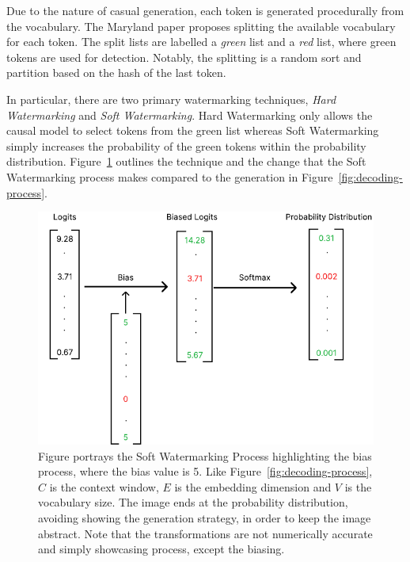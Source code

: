 \documentclass{l4proj}
\theoremstyle{definition}
\begin{document}
        Due to the nature of casual generation, each token is generated procedurally from the vocabulary. The Maryland paper proposes splitting the available vocabulary for each token. The split lists are labelled a \emph{green} list and a \emph{red} list, where green tokens are used for detection. Notably, the splitting is a random sort and partition based on the hash of the last token.

        In particular, there are two primary watermarking techniques, \emph{Hard Watermarking} and \emph{Soft Watermarking}. Hard Watermarking only allows the causal model to select tokens from the green list whereas Soft Watermarking simply increases the probability of the green tokens within the probability distribution. Figure~\ref{fig:soft-watermarking-process} outlines the technique and the change that the Soft Watermarking process makes compared to the generation in Figure~\ref{fig:decoding-process}.

        \begin{figure}
            \centering
            \includegraphics[width=1\linewidth, keepaspectratio]{images/background/biasing-process.pdf}
            \caption{Figure portrays the Soft Watermarking Process highlighting the bias process, where the bias value is 5. Like Figure~\ref{fig:decoding-process}, $C$ is the context window, $E$ is the embedding dimension and $V$ is the vocabulary size. The image ends at the probability distribution, avoiding showing the generation strategy, in order to keep the image abstract. Note that the transformations are not numerically accurate and simply showcasing process, except the biasing.}
            \label{fig:soft-watermarking-process}
        \end{figure}
\end{document}
